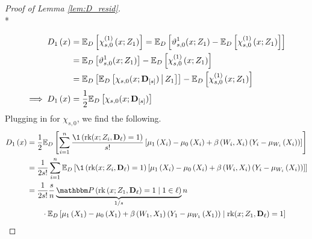 \begin{proof}[Proof of Lemma \ref{lem:D_resid}]\mbox{}\\*

    \begin{equation}
        \begin{aligned}
            D_{1}\left(x\right)
            & = \mathbb{E}_{D}\left[\chi_{s,0}^{(1)}\left(x; Z_{1}\right)\right] 
            = \mathbb{E}_{D}\left[\vartheta_{s,0}^{1}(x; Z_1) - \mathbb{E}_{D}\left[\chi_{s,0}^{(1)}\left(x; Z_{1}\right)\right]\right] \\
            & = \mathbb{E}_{D}\left[\vartheta_{s,0}^{1}(x; Z_1)\right] - \mathbb{E}_{D}\left[\chi_{s,0}^{(1)}\left(x; Z_{1}\right)\right] \\
            & = \mathbb{E}_{D}\left[\mathbb{E}_{D}\left[\chi_{s,0}(x; \mathbf{D}_{[s]}) \, \middle| \, Z_1 \right]\right]
            - \mathbb{E}_{D}\left[\chi_{s,0}^{(1)}\left(x; Z_{1}\right)\right] \\
            \implies D_{1}\left(x\right)
            & = \frac{1}{2} \mathbb{E}_{D}\left[\chi_{s,0}(x; \mathbf{D}_{[s]})\right]
        \end{aligned}
    \end{equation}
    Plugging in for $\chi_{s,0}$, we find the following.
    \begin{equation}
        \begin{aligned}
            D_{1}\left(x\right)
            & = \frac{1}{2} \E_{D}\left[\sum_{i = 1}^{n}\frac{\1\left(\rk(x; Z_{i}, \mathbf{D}_{\ell}) = 1\right)}{s!} 
            \left[\mu_{1}\left(X_{i}\right) - \mu_{0}\left(X_{i}\right) + \beta\left(W_{i}, X_{i}\right)\left(Y_{i} - \mu_{W_{i}}\left(X_{i}\right)\right)\right]\right] \\
            & = \frac{1}{2s!}\sum_{i = 1}^{n}\E_{D}\left[\1\left(\rk(x; Z_{i}, \mathbf{D}_{\ell}) = 1\right)
            \left[\mu_{1}\left(X_{i}\right) - \mu_{0}\left(X_{i}\right) + \beta\left(W_{i}, X_{i}\right)\left(Y_{i} - \mu_{W_{i}}\left(X_{i}\right)\right)\right]\right] \\
            & = \frac{1}{2s!}
            \frac{s}{n}
            \underbrace{\P\left(\operatorname{rk}\left(x; Z_1, \mathbf{D}_{\ell}\right) = 1 \; \middle| \; 1 \in \ell \right)}_{1/s}
            n \\
            & \quad \quad \cdot \E_{D}\left[
            \mu_{1}\left(X_{1}\right) - \mu_{0}\left(X_{1}\right) + \beta\left(W_{1}, X_{1}\right)\left(Y_{1} - \mu_{W_{1}}\left(X_{1}\right)\right) \; \middle| \; \operatorname{rk}(x; Z_1, \mathbf{D}_{\ell}) = 1\right] \\

\end{aligned}
\end{equation}
\end{proof}
